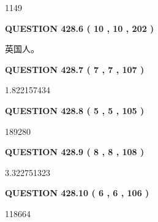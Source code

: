\documentclass{ctexart}
\begin{document}
1149
 
 
  
\vspace{0.2in}
  
{\textbf{\Large{QUESTION
428.6 
 ( 10 , 10 , 202 )
}}}
  
  
 
 
\noindent{}
 
 
英国人。
 
 
 
 
  
\vspace{0.2in}
  
{\textbf{\Large{QUESTION
428.7 
 ( 7 , 7 , 107 )
}}}
  
  
 
 
\noindent{}

1.822157434
 
 
  
\vspace{0.2in}
  
{\textbf{\Large{QUESTION
428.8 
 ( 5 , 5 , 105 )
}}}
  
  
 
 
\noindent{}

189280
 
 
  
\vspace{0.2in}
  
{\textbf{\Large{QUESTION
428.9 
 ( 8 , 8 , 108 )
}}}
  
  
 
 
\noindent{}

3.322751323
 
 
  
\vspace{0.2in}
  
{\textbf{\Large{QUESTION
428.10 
 ( 6 , 6 , 106 )
}}}
  
  
 
 
\noindent{}

118664
 
 
   
   
 \vspace{0.2in}
 
\end{document}
